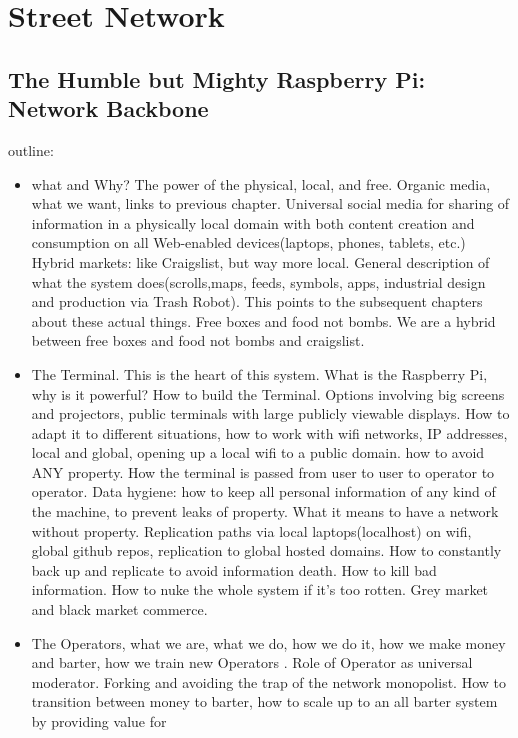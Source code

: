 
\section{Street Network}

\subsection{The Humble but Mighty Raspberry Pi: Network Backbone}



outline:
\begin{itemize}
  \item
  what and Why?  The power of the physical, local, and free.  Organic media, what we want, links to previous chapter.  Universal social media for sharing of information in a physically local domain with both content creation and consumption on all Web-enabled devices(laptops, phones, tablets, etc.)  Hybrid markets: like Craigslist, but way more local.  General description of what the system does(scrolls,maps, feeds, symbols, apps, industrial design and production via Trash Robot). This points to the subsequent chapters about these actual things.  Free boxes and food not bombs.  We are a hybrid between free boxes and food not bombs and craigslist.
  \item
  The Terminal.  This is the heart of this system. What is the Raspberry Pi, why is it powerful?  How to build the Terminal. Options involving big screens and projectors, public terminals with large publicly viewable displays.  How to adapt it to different situations, how to work with wifi networks, IP addresses, local and global, opening up a local wifi to a public domain.  how to avoid ANY property.  How the terminal is passed from user to user to operator to operator.  Data hygiene: how to keep all personal information of any kind of the machine, to prevent leaks of property.  What it means to have a network without property.  Replication paths via local laptops(localhost) on wifi, global github repos, replication to global hosted domains. How to constantly back up and replicate to avoid information death.  How to kill bad information.  How to nuke the whole system if it's too rotten.  Grey market and black market commerce.
  \item
  The Operators, what we are, what we do, how we do it, how we make money and barter, how we train new Operators .  Role of Operator as universal moderator.  Forking and avoiding the trap of the network monopolist.  How to transition between money to barter, how to scale up to an all barter system by providing value for 

\end{itemize}
